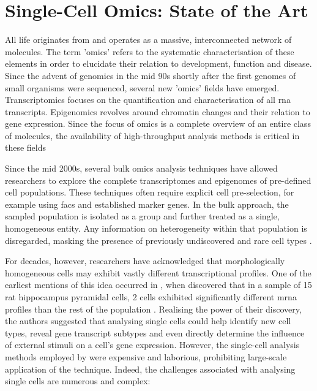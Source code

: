 \chapter{Single-Cell Omics: State of the Art}
\label{ch:litrev}
All life originates from and operates as a massive, interconnected network of molecules. The term 'omics' refers to the systematic characterisation of these elements in order to elucidate their relation to development, function and disease. Since the advent of genomics in the mid 90s shortly after the first genomes of small organisms were sequenced, several new 'omics' fields have emerged. Transcriptomics focuses on the quantification and characterisation of all \acrshort{rna} transcripts. Epigenomics revolves around chromatin changes and their relation to gene expression. Since the focus of omics is a complete overview of an entire class of molecules, the availability of high-throughput analysis methods is critical in these fields \citep{hood2004, patti2012, patterson2003}\pms

Since the mid 2000s, several bulk omics analysis techniques have allowed researchers to explore the complete transcriptomes and epigenomes of pre-defined cell populations. These techniques often require explicit cell pre-selection, for example using \acrfull{facs} and established marker genes. In the bulk approach, the sampled population is isolated as a group and further treated as a single, homogeneous entity. Any information on heterogeneity within that population is disregarded, masking the presence of previously undiscovered and rare cell types \citep{bengtsson2005, wang2010, kolodziejczyk2015, grun2015}.\pms

For decades, however, researchers have acknowledged that morphologically homogeneous cells may exhibit vastly different transcriptional profiles. One of the earliest mentions of this idea occurred in \citeyear{eberwine1992}, when \citeauthor{eberwine1992} discovered that in a sample of 15 rat hippocampus pyramidal cells, 2 cells exhibited significantly different \acrfull{mrna} profiles than the rest of the population \citep{eberwine1992}. Realising the power of their discovery, the authors suggested that analysing single cells could help identify new cell types, reveal gene transcript subtypes and even directly determine the influence of external stimuli on a cell's gene expression. However, the single-cell analysis methods employed by \citeauthor{eberwine1992} were expensive and laborious, prohibiting large-scale application of the technique. Indeed, the challenges associated with analysing single cells are numerous and complex:

